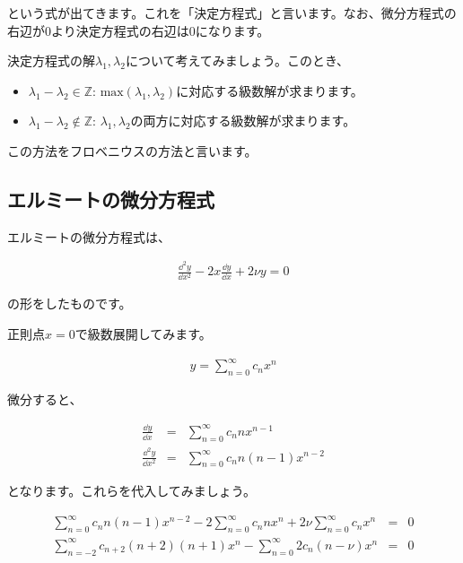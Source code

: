 \noindent
という式が出てきます。これを「決定方程式」と言います。なお、微分方程式の右辺が0より決定方程式の右辺は0になります。

決定方程式の解$\lambda_1,\lambda_2$について考えてみましょう。このとき、

\begin{itemize}
    \item $\lambda_1-\lambda_2\in \mathbb{Z}$: $\mathrm{max}(\lambda_1,\lambda_2)$に対応する級数解が求まります。
    \item $\lambda_1-\lambda_2\notin \mathbb{Z}$: $\lambda_1,\lambda_2$の両方に対応する級数解が求まります。
\end{itemize}

この方法をフロベニウスの方法と言います。








\subsection{エルミートの微分方程式}
\label{hermite}
エルミートの微分方程式は、

\begin{eqnarray}
    \frac{\dd^2 y}{\dd x^2}-2x\frac{\dd y}{\dd x}+2\nu y=0
\end{eqnarray}

\noindent
の形をしたものです。

正則点$x=0$で級数展開してみます。

\begin{eqnarray}
    y=\sum_{n=0}^\infty c_nx^n
\end{eqnarray}

微分すると、

\begin{eqnarray}
    \frac{\dd y}{\dd x}&=&\sum_{n=0}^\infty c_n nx^{n-1} \\
    \frac{\dd^2 y}{\dd x^2}&=&\sum_{n=0}^\infty c_n n(n-1)x^{n-2}
\end{eqnarray}

\nonumber
となります。これらを代入してみましょう。

\begin{eqnarray}
    \sum_{n=0}^\infty c_n n(n-1)x^{n-2}-2\sum_{n=0}^\infty c_n nx^n+2\nu \sum_{n=0}^\infty c_nx^n&=&0 \\
    \sum_{n=-2}^\infty c_{n+2}(n+2)(n+1)x^n-\sum_{n=0}^\infty 2c_n(n-\nu)x^n&=&0
    \label{eq:hermite-1}
\end{eqnarray}

